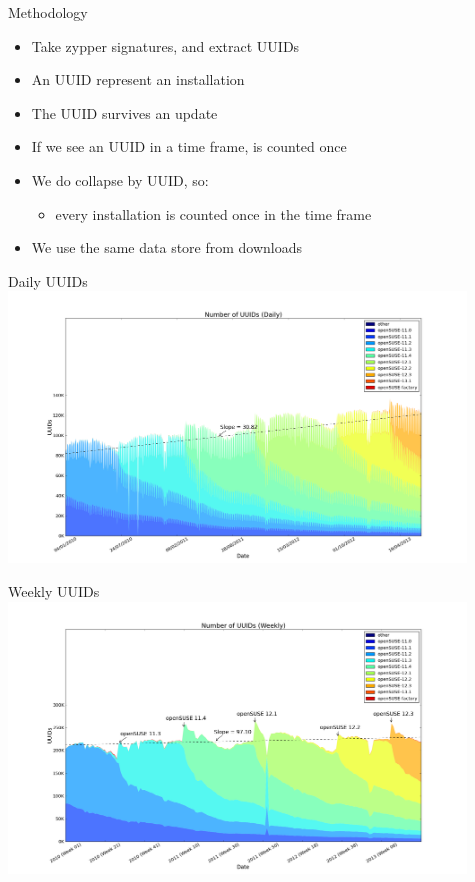 \documentclass{beamer}
\begin{document}
\begin{frame}{Methodology}
  \begin{itemize}
  \item Take zypper signatures, and extract UUIDs
  \item An UUID represent an installation
  \item The UUID survives an update
  \item If we see an UUID in a time frame, is counted once
  \item We do collapse by UUID, so:
    \begin{itemize}
    \item every installation is counted once in the time frame
    \end{itemize}
  \item We use the same data store from downloads
  \end{itemize}
\end{frame}

\begin{frame}{Daily UUIDs}
  \includegraphics[height=7.2cm]{uuid_day}
\end{frame}

\begin{frame}{Weekly UUIDs}
  \includegraphics[height=7.2cm]{uuid_week}
\end{frame}
\end{document}
